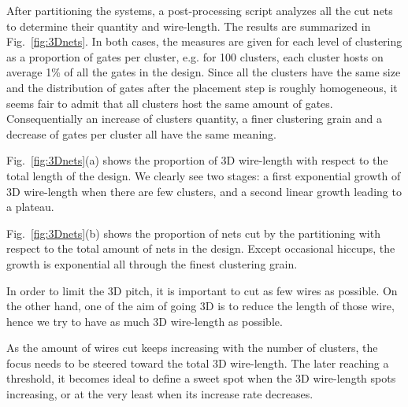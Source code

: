 \documentclass[conference]{IEEEtran}
\begin{document}


After partitioning the systems, a post-processing script analyzes all the cut nets to determine their quantity and wire-length.
The results are summarized in Fig.~\ref{fig:3Dnets}.
In both cases, the measures are given for each level of clustering as a proportion of gates per cluster, e.g. for 100 clusters, each cluster hosts on average 1\% of all the gates in the design.
Since all the clusters have the same size and the distribution of gates after the placement step is roughly homogeneous, it seems fair to admit that all clusters host the same amount of gates.
Consequentially an increase of clusters quantity, a finer clustering grain and a decrease of gates per cluster all have the same meaning.

Fig.~\ref{fig:3Dnets}(a) shows the proportion of 3D wire-length with respect to the total length of the design.
We clearly see two stages: a first exponential growth of 3D wire-length when there are few clusters, and a second linear growth leading to a plateau.

Fig.~\ref{fig:3Dnets}(b) shows the proportion of nets cut by the partitioning with respect to the total amount of nets in the design.
Except occasional hiccups, the growth is exponential all through the finest clustering grain.

In order to limit the 3D pitch, it is important to cut as few wires as possible.
On the other hand, one of the aim of going 3D is to reduce the length of those wire, hence we try to have as much 3D wire-length as possible.

As the amount of wires cut keeps increasing with the number of clusters, the focus needs to be steered toward the total 3D wire-length.
The later reaching a threshold, it becomes ideal to define a sweet spot when the 3D wire-length spots increasing, or at the very least when its increase rate decreases.
\end{document}
